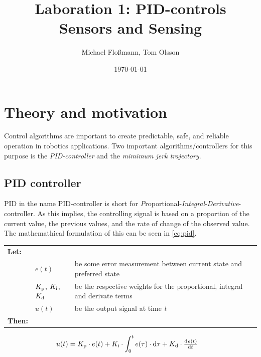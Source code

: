 \documentclass[11pt]{article}
\title{Laboration 1: PID-controls\\ {\small Sensors and Sensing}}
\author{Michael Flo{\ss}mann, Tom Olsson}
\date{\today}
\begin{document}
\maketitle %
\listoffigures %
\lstlistoflistings %
\lstset{ matchrangestart=t} %
\section{Theory and motivation}
Control algorithms are important to create predictable, safe, and reliable operation in robotics applications. Two important algorithms/controllers for this purpose is the \emph{PID-controller} and the \emph{mimimum jerk trajectory}. 

\subsection{PID controller}
PID in the name PID-controller is short for \emph{P}roportional-\emph{Integral}-\emph{Derivative}-controller. As this implies, the controlling signal is based on a proportion of the current value, the previous values, and the rate of change of the observed value. The mathemathical formulation of this can be seen in \vref{eq:pid}.\par \vspace{10pt}
{\footnotesize
  \begin{tabular}{l l l}
    \textbf{Let:} \\
 &$e(t)$ &be some error measurement between current state and preferred state\\
 &$K_\textup{p}$, $K_\textup{i}$, $K_\textup{d}$ &be the respective weights for the proportional, integral and derivate terms \\
 &$u(t)$ &be the output signal at time \emph{t} \\
    \textbf{Then:}
  \end{tabular}
  \begin{align}
    u(t) &= \di{K}{p}\cdot e(t) + \di{K}{i} \cdot\int_{0}^{t}e(\tau)\cdot \dif\tau + \di{K}{d} \cdot \od{e(t)}{t}\label{eq:pid}
  \end{align}}
\par
\end{document}
